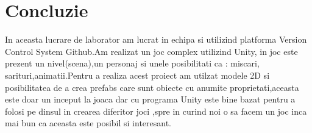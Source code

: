 \section*{Concluzie}
In aceasta lucrare de laborator am lucrat in echipa si utilizind platforma Version Control System Github.Am realizat un joc complex utilizind Unity, in joc este prezent un nivel(scena),un personaj si unele posibilitati ca : miscari, sarituri,animatii.Pentru a realiza acest proiect am utilzat modele 2D si posibilitatea de a crea prefabs care sunt obiecte cu anumite proprietati,aceasta este doar un inceput la joaca dar cu programa Unity este bine bazat pentru a folosi pe dinsul in crearea diferitor joci ,spre in curind noi o sa facem un joc inca mai bun ca aceasta este posibil si interesant. 

\clearpage